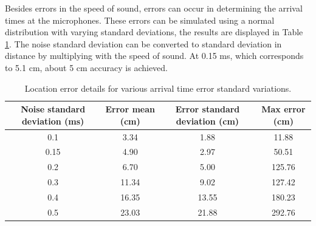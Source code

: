 \documentclass[final]{scrreprt} %
\begin{document}
Besides errors in the speed of sound, errors can occur in determining the arrival times at the microphones.
These errors can be simulated using a normal distribution with varying standard deviations, the results are displayed in Table \ref{tab:std-errors}.
The noise standard deviation can be converted to standard deviation in distance by multiplying with the speed of sound.
At 0.15 ms, which corresponds to 5.1 cm, about 5 cm accuracy is achieved.

\begin{table} [H]
\centering
	\begin{tabular}{ c | c | c | c }
  	Noise standard deviation (ms) & Error mean (cm) & Error standard deviation (cm) & Max error (cm) \\ \hline
	0.1 & 3.34 & 1.88 & 11.88 \\
	0.15 & 4.90 & 2.97 & 50.51 \\
	0.2 & 6.70 & 5.00 & 125.76 \\
	0.3 & 11.34 & 9.02 & 127.42 \\
	0.4 & 16.35 & 13.55 & 180.23 \\
	0.5 & 23.03 & 21.88 & 292.76 \\
	\end{tabular}
\caption{Location error details for various arrival time error standard variations.}
\label{tab:std-errors}
\end{table}
\end{document}
